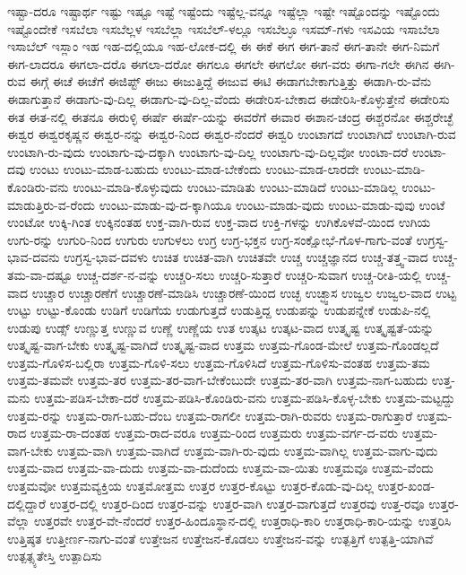 {ಇಷ್ಟಾ-ದರೂ
ಇಷ್ಟಾರ್ಥ
ಇಷ್ಟು
ಇಷ್ಟೂ
ಇಷ್ಟೆ
ಇಷ್ಟೆಂದು
ಇಷ್ಟೆಲ್ಲ-ವನ್ನೂ
ಇಷ್ಟೆಲ್ಲಾ
ಇಷ್ಟೇ
ಇಷ್ಟೊಂದನ್ನು
ಇಷ್ಟೊಂದು
ಇಷ್ಟೊಂದೇಕೆ
ಇಸಬೆಲಾ
ಇಸಬೆಲ್ಲಳ
ಇಸಬೆಲ್ಲಾ
ಇಸಬೆಲ್-ಳಲ್ಲೂ
ಇಸಬೆಲ್ಳೂ
ಇಸಮ್-ಗಳು
ಇಸವಿಯ
ಇಸಾಬೆಲಾ
ಇಸಾಬೆಲ್
ಇಸ್ಲಾಂ
ಇಹ
ಇಹ-ದಲ್ಲಿಯೂ
ಇಹ-ಲೋಕ-ದಲ್ಲಿ
ಈ
ಈಕೆ
ಈಗ
ಈಗ-ತಾನೆ
ಈಗ-ತಾನೇ
ಈಗ-ನಿಮಗೆ
ಈಗ-ಲಾದರೂ
ಈಗಲಾ-ದರೊ
ಈಗಲಾ-ದರೋ
ಈಗಲೂ
ಈಗಲೇ
ಈಗಲೋ
ಈಗ-ವರು
ಈಗಾ-ಗಲೇ
ಈಗಿನ
ಈಗಿ-ರುವ
ಈಗ್ಗೆ
ಈಚೆ
ಈಚೆಗೆ
ಈಜಿಪ್ಟ್
ಈಜು
ಈಜುತ್ತಿದ್ದೆ
ಈಜುವ
ಈಟಿ
ಈಡಾಗಬೇಕಾಗುತ್ತಿತ್ತು
ಈಡಾಗಿ-ರು-ವೆನು
ಈಡಾಗುತ್ತಾನೆ
ಈಡಾಗು-ವು-ದಿಲ್ಲ
ಈಡಾಗು-ವು-ದಿಲ್ಲ-ವೆಂದು
ಈಡೇರಿಸ-ಬೇಕಾದ
ಈಡೇರಿಸಿ-ಕೊಳ್ಳುತ್ತೇನೆ
ಈಡೇರಿಸು
ಈತ
ಈತ-ನಲ್ಲಿ
ಈತನೂ
ಈರುಳ್ಳಿ
ಈರ್ಷೆ
ಈರ್ಷೆ-ಯನ್ನು
ಈವರೆಗೆ
ಈವಾರ
ಈಶಾನ-ಚಂದ್ರ
ಈಶ್ಚರನೋ
ಈಶ್ಚರೇಚ್ಛೆ
ಈಶ್ವರ
ಈಶ್ವರಕೃಷ್ಣನ
ಈಶ್ವರ-ನನ್ನು
ಈಶ್ವರ-ನಿಂದ
ಈಶ್ವರ-ನೆಂದರೆ
ಈಶ್ವರಿ
ಉಂಟಾಗದೆ
ಉಂಟಾಗಿದೆ
ಉಂಟಾಗಿ-ರುವ
ಉಂಟಾಗಿ-ರು-ವುದು
ಉಂಟಾಗು-ವು-ದಕ್ಕಾಗಿ
ಉಂಟಾಗು-ವು-ದಿಲ್ಲ
ಉಂಟಾಗು-ವು-ದಿಲ್ಲವೋ
ಉಂಟಾ-ದರೆ
ಉಂಟಾ-ದವು
ಉಂಟು
ಉಂಟು-ಮಾಡ-ಬಹುದು
ಉಂಟು-ಮಾಡ-ಬೇಕೆಂದು
ಉಂಟು-ಮಾಡ-ಲಾರದೇ
ಉಂಟು-ಮಾಡಿ-ಕೊಂಡಿರು-ವನು
ಉಂಟು-ಮಾಡಿ-ಕೊಳ್ಳುವುದು
ಉಂಟು-ಮಾಡಿತು
ಉಂಟು-ಮಾಡಿದೆ
ಉಂಟು-ಮಾಡಿಲ್ಲ
ಉಂಟು-ಮಾಡುತ್ತಿರು-ವ-ರೆಂದು
ಉಂಟು-ಮಾಡು-ವು-ದ-ಕ್ಕಾಗಿಯೂ
ಉಂಟು-ಮಾಡು-ವುದು
ಉಂಟು-ಮಾಡು-ವುವು
ಉಂಟೆ
ಉಂಟೋ
ಉಕ್ಕಿ-ಗಿಂತ
ಉಕ್ಕಿನಂತಹ
ಉಕ್ತ-ವಾಗಿ-ರುವ
ಉಕ್ತ-ವಾದ
ಉಕ್ತಿ-ಗಳನ್ನು
ಉಗಿಕೊಳವೆ-ಯಿಂದ
ಉಗಿಯ
ಉಗು-ರನ್ನು
ಉಗುರಿ-ನಿಂದ
ಉಗುರು
ಉಗುಳಲು
ಉಗ್ರ
ಉಗ್ರ-ಭಕ್ತನ
ಉಗ್ರ-ಸಂಕ್ಷೋಭೆ-ಗೊಳ-ಗಾಗು-ವಂತೆ
ಉಗ್ರಸ್ವ-ಭಾವ-ದವನು
ಉಗ್ರಸ್ವ-ಭಾವ-ದವಳು
ಉಚಿತ
ಉಚಿತ-ವಾಗಿ
ಉಚಿತವೇ
ಉಚ್ಚ
ಉಚ್ಚಜ್ಞಾನದ
ಉಚ್ಚ-ತತ್ತ್ವ-ವಾದ
ಉಚ್ಚ-ತಮ-ವಾ-ದಷ್ಟೂ
ಉಚ್ಚ-ದರ್ಶ-ನ-ವನ್ನು
ಉಚ್ಚರಿ-ಸಲು
ಉಚ್ಚರಿ-ಸುತ್ತಾರೆ
ಉಚ್ಚರಿ-ಸುವಾಗ
ಉಚ್ಚ-ರೀತಿ-ಯಲ್ಲಿ
ಉಚ್ಚ-ವಾದ
ಉಚ್ಚಾರ
ಉಚ್ಚಾರಣೆಗೆ
ಉಚ್ಚಾರಣೆ-ಮಾಡಿಸಿ
ಉಚ್ಚಾರಣೆ-ಯಿಂದ
ಉಚ್ಛ
ಉಚ್ಛ್ವಾಸ
ಉಜ್ವಲ
ಉಜ್ವಲ-ವಾದ
ಉಟ್ಟ
ಉಟ್ಟು
ಉಟ್ಟು-ಕೊಂಡು
ಉಡಿಗೆ
ಉಡಿಗೆಯ
ಉಡುಗುತ್ತದೆ
ಉಡುತ್ತಿದ್ದ
ಉಡುಪನ್ನು
ಉಡುಪನ್ನೇಕೆ
ಉಡುಪಿ-ನಲ್ಲಿ
ಉಡುಪು
ಉಡ್ಸ್
ಉಣ್ಣುತ್ತ
ಉಣ್ಣುವ
ಉಣ್ಣೆ
ಉಣ್ಣೆಯ
ಉತ
ಉತ್ಕಟ
ಉತ್ಕಟ-ವಾದ
ಉತ್ಕೃಷ್ಟ
ಉತ್ಕೃಷ್ಟತೆ-ಯನ್ನು
ಉತ್ಕೃಷ್ಟ-ವಾಗ-ಬೇಕು
ಉತ್ಕೃಷ್ಟ-ವಾಗಿದೆ
ಉತ್ಕೃಷ್ಟ-ವಾದ
ಉತ್ತಮ
ಉತ್ತಮ-ಗೊಂಡ-ಮೇಲೆ
ಉತ್ತಮ-ಗೊಂಡಲ್ಲದೆ
ಉತ್ತಮ-ಗೊಳಿಸ-ಬಲ್ಲಿರಾ
ಉತ್ತಮ-ಗೊಳಿ-ಸಲು
ಉತ್ತಮ-ಗೊಳಿಸಿದೆ
ಉತ್ತಮ-ಗೊಳಿಸು-ವಂತಹ
ಉತ್ತಮ-ತಮ
ಉತ್ತಮ-ತಮವೇ
ಉತ್ತಮ-ತರ
ಉತ್ತಮ-ತರ-ವಾಗ-ಬೇಕೆಂಬುದೇ
ಉತ್ತಮ-ತರ-ವಾಗಿ
ಉತ್ತಮ-ನಾಗ-ಬಹುದು
ಉತ್ತ-ಮನು
ಉತ್ತಮ-ಪಡಿಸ-ಬೇಕಾ-ದರೆ
ಉತ್ತಮ-ಪಡಿಸಿ-ಕೊಂಡಿರು-ವನು
ಉತ್ತಮ-ಪಡಿಸಿ-ಕೊಳ್ಳ-ಬೇಕು
ಉತ್ತಮ-ಮಟ್ಟದ್ದು
ಉತ್ತಮ-ರನ್ನು
ಉತ್ತಮ-ರಾಗ-ಬಹು-ದೆಂಬ
ಉತ್ತಮ-ರಾಗಲೀ
ಉತ್ತಮ-ರಾಗಿ-ರುವರು
ಉತ್ತಮ-ರಾಗುತ್ತಾರೆ
ಉತ್ತಮ-ರಾದ
ಉತ್ತಮ-ರಾ-ದಂತಹ
ಉತ್ತಮ-ರಾದ-ವರೂ
ಉತ್ತಮ-ರಿಂದ
ಉತ್ತಮರು
ಉತ್ತಮ-ವರ್ಗ-ದ-ವರು
ಉತ್ತಮ-ವಾಗ-ಬೇಕು
ಉತ್ತಮ-ವಾಗಿ
ಉತ್ತಮ-ವಾಗಿದೆ
ಉತ್ತಮ-ವಾಗಿ-ರು-ವುದು
ಉತ್ತಮ-ವಾಗಿಲ್ಲ
ಉತ್ತಮ-ವಾಗು-ವುದು
ಉತ್ತಮ-ವಾದ
ಉತ್ತಮ-ವಾ-ದುದು
ಉತ್ತಮ-ವಾ-ದುದೆಂದು
ಉತ್ತಮ-ವಾ-ಯಿತು
ಉತ್ತಮವೂ
ಉತ್ತಮ-ವೆಂದು
ಉತ್ತಮವೋ
ಉತ್ತಮವ್ಯಕ್ತಿಯ
ಉತ್ತಮೋತ್ತಮ
ಉತ್ತರ
ಉತ್ತರ-ಕೊಟ್ಟು
ಉತ್ತರ-ಕೊಡು-ವು-ದಿಲ್ಲ
ಉತ್ತರ-ಖಂಡ-ದಲ್ಲಿದ್ದಾರೆ
ಉತ್ತರ-ದಲ್ಲಿ
ಉತ್ತರ-ದಿಂದ
ಉತ್ತರ-ವನ್ನು
ಉತ್ತರ-ವಾಗಿ
ಉತ್ತರ-ವಾಗುತ್ತದೆ
ಉತ್ತರವು
ಉತ್ತ-ರವೂ
ಉತ್ತರ-ವೆಲ್ಲಾ
ಉತ್ತರವೇ
ಉತ್ತರ-ವೇ-ನೆಂದರೆ
ಉತ್ತರ-ಹಿಂದೂಸ್ಥಾನ-ದಲ್ಲಿ
ಉತ್ತರಾಧಿ-ಕಾರಿ
ಉತ್ತರಾಧಿ-ಕಾರಿ-ಯನ್ನು
ಉತ್ತರಿಸಿ
ಉತ್ತಿಷ್ಠತ
ಉತ್ತೀರ್ಣ-ನಾಗು-ವಂತೆ
ಉತ್ತೇಜನ
ಉತ್ತೇಜನ-ಕೊಡಲು
ಉತ್ತೇಜನ-ವನ್ನು
ಉತ್ಪತ್ತಿಗೆ
ಉತ್ಪತ್ತಿ-ಯಾಗಿವೆ
ಉತ್ಪತ್ಸ್ಯತೇಸ್ತಿ
ಉತ್ಪಾದಿಸು
}
